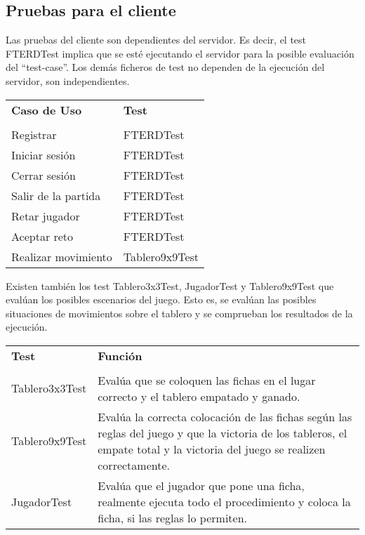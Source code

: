 \clearpage

\subsection{Pruebas para el cliente}

Las pruebas del cliente son dependientes del servidor. Es decir, el test FTERDTest implica que se esté ejecutando el servidor para la posible evaluación del ``test-case''. Los demás ficheros de test no dependen de la ejecución del servidor, son independientes.


\begin{center}
{\footnotesize
\begin{tabularx}{0.95\textwidth}{p{}|X}

\textbf{Caso de Uso} & \textbf{Test} \\
& \\
Registrar & FTERDTest\\
Iniciar sesión & FTERDTest\\
Cerrar sesión &FTERDTest \\
Salir de la partida & FTERDTest\\
Retar jugador &FTERDTest \\
Aceptar reto&FTERDTest\\
Realizar movimiento& Tablero9x9Test\\
\end{tabularx}
}
\end{center}

Existen también los test Tablero3x3Test, JugadorTest y Tablero9x9Test que evalúan los posibles escenarios del juego. Esto es, se evalúan las posibles situaciones de movimientos sobre el tablero y se comprueban los resultados de la ejecución.
\begin{center}
{\footnotesize
\begin{tabularx}{0.95\textwidth}{p{}|X}

\textbf{Test} & \textbf{Función} \\
& \\
Tablero3x3Test & Evalúa que se coloquen las fichas en el lugar correcto y el tablero empatado y ganado.\\
Tablero9x9Test & Evalúa la correcta colocación de las fichas según las reglas del juego y que la victoria de los tableros, el empate total y la victoria del juego se realizen correctamente. \\
JugadorTest &Evalúa que el jugador que pone una ficha, realmente ejecuta todo el procedimiento y coloca la ficha, si las reglas lo permiten. \\
\end{tabularx}
}
\end{center}
